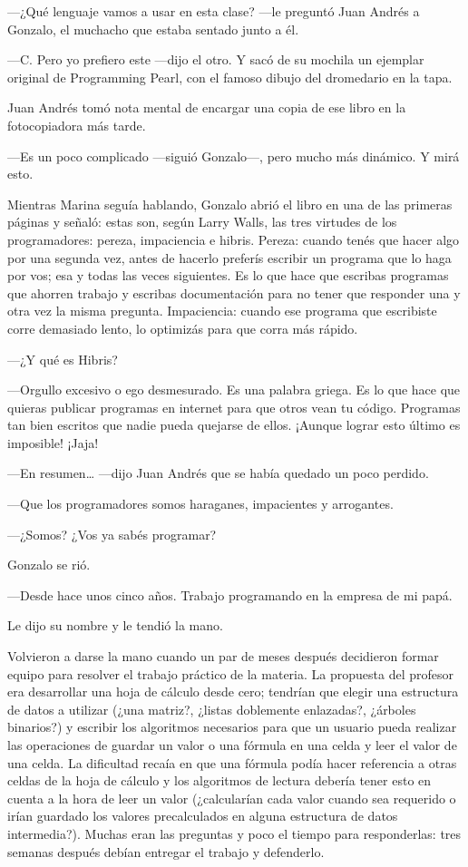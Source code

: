 \documentclass[12pt,twoside,openright]{book}
\begin{document}
---¿Qué lenguaje vamos a usar en esta clase? ---le preguntó Juan Andrés a Gonzalo, el muchacho que estaba sentado junto a él.

---C. Pero yo prefiero este ---dijo el otro. Y sacó de su mochila un ejemplar original de Programming Pearl, con el famoso dibujo del dromedario en la tapa.

Juan Andrés tomó nota mental de encargar una copia de ese libro en la fotocopiadora más tarde.

---Es un poco complicado ---siguió Gonzalo---, pero mucho más dinámico. Y mirá esto.

Mientras Marina seguía hablando, Gonzalo abrió el libro en una de las primeras páginas y señaló: estas son, según Larry Walls, las tres virtudes de los programadores: pereza, impaciencia e hibris. Pereza: cuando tenés que hacer algo por una segunda vez, antes de hacerlo preferís escribir un programa que lo haga por vos; esa y todas las veces siguientes. Es lo que hace que escribas programas que ahorren trabajo y escribas documentación para no tener que responder una y otra vez la misma pregunta. Impaciencia: cuando ese programa que escribiste corre demasiado lento, lo optimizás para que corra más rápido.

---¿Y qué es Hibris?

---Orgullo excesivo o ego desmesurado. Es una palabra griega. Es lo que hace que quieras publicar programas en internet para que otros vean tu código. Programas tan bien escritos que nadie pueda quejarse de ellos. ¡Aunque lograr esto último es imposible! ¡Jaja!

---En resumen… ---dijo Juan Andrés que se había quedado un poco perdido.

---Que los programadores somos haraganes, impacientes y arrogantes.

---¿Somos? ¿Vos ya sabés programar?

Gonzalo se rió.

---Desde hace unos cinco años. Trabajo programando en la empresa de mi papá.

Le dijo su nombre y le tendió la mano.

Volvieron a darse la mano cuando un par de meses después decidieron formar equipo para resolver el trabajo práctico de la materia. La propuesta del profesor era desarrollar una hoja de cálculo desde cero; tendrían que elegir una estructura de datos a utilizar (¿una matriz?, ¿listas doblemente enlazadas?, ¿árboles binarios?) y escribir los algoritmos necesarios para que un usuario pueda realizar las operaciones de guardar un valor o una fórmula en una celda y leer el valor de una celda. La dificultad recaía en que una fórmula podía hacer referencia a otras celdas de la hoja de cálculo y los algoritmos de lectura debería tener esto en cuenta a la hora de leer un valor (¿calcularían cada valor cuando sea requerido o irían guardado los valores precalculados en alguna estructura de datos intermedia?). Muchas eran las preguntas y poco el tiempo para responderlas: tres semanas después debían entregar el trabajo y defenderlo.
\end{document}
